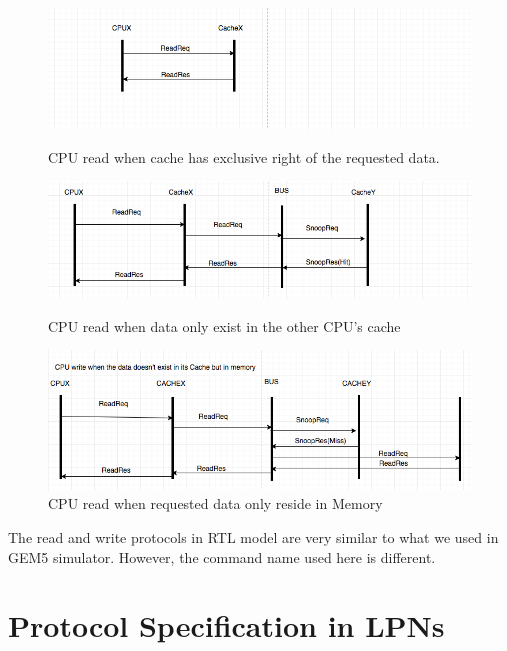 \documentclass[12pt,frontmatter,copyright,thesis]{usfmanus}
\begin{document}
\begin{appendix}
\begin{figure}[h!] 
\centering
 \includegraphics[width=5In]{y5.png}
  \caption{\footnotesize CPU read when cache has exclusive right of the requested data. }
 \label{y4}
 \centering
 \includegraphics[width=5In]{y6.png}
 \caption{\footnotesize CPU read when data only exist in the other CPU's cache }
 \label{y5}
 \centering
 \includegraphics[width=5In]{y7.png}
 \caption{\footnotesize CPU read when requested data only reside in Memory }
 \label{y6}

\end{figure}
 The read and write protocols in RTL model are very similar to what we used in
 GEM5 simulator. However, the command name used here is different.


\section{Protocol Specification in LPNs}


\end{appendix}
\end{document}
